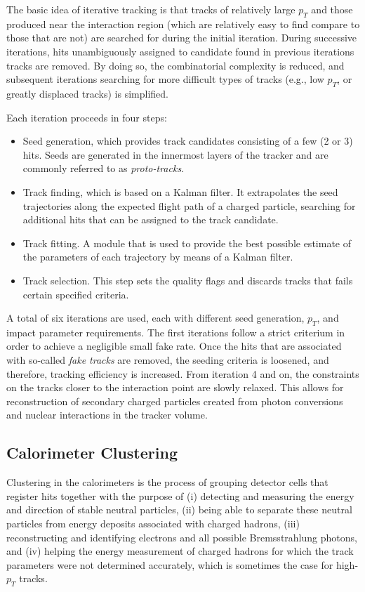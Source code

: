 The basic idea of iterative tracking is that tracks of relatively large $p_{T}$ and those produced near the interaction region (which are relatively easy to find compare to those that are not) are searched for during the initial iteration. During successive iterations, hits unambiguously assigned to candidate found in previous iterations tracks are removed. By doing so, the combinatorial complexity is reduced, and subsequent iterations searching for more difficult types of tracks (e.g., low $p_{T}$, or greatly displaced tracks) is simplified.

Each iteration proceeds in four steps:

\begin{itemize}
	\item Seed generation, which provides track candidates consisting of a few (2 or 3) hits. Seeds are generated in the innermost layers of the tracker and are commonly referred to as \textit{proto-tracks}.
	\item Track finding, which is based on a Kalman filter. It extrapolates the seed trajectories along the expected flight path of a charged particle, searching for additional hits that can be assigned to the track candidate.
	\item Track fitting. A module that is used to provide the best possible estimate of the parameters of each trajectory by means of a Kalman filter.
	\item Track selection. This step sets the quality flags and discards tracks that fails certain specified criteria.
\end{itemize}

A total of six iterations are used, each with different seed generation, $p_{T}$, and impact parameter requirements. The first iterations follow a strict criterium in order to achieve a negligible small fake rate. Once the hits that are associated with so-called \textit{fake tracks} are removed, the seeding criteria is loosened, and therefore, tracking efficiency is increased. From iteration 4 and on, the constraints on the tracks closer to the interaction point are slowly relaxed. This allows for reconstruction of secondary charged particles created from photon conversions and nuclear interactions in the tracker volume.

\subsection{Calorimeter Clustering}
Clustering in the calorimeters is the process of grouping detector cells that register hits together with the purpose of (i) detecting and measuring the energy and direction of stable neutral particles, (ii) being able to separate these neutral particles from energy deposits associated with charged hadrons, (iii) reconstructing and identifying electrons and all possible Bremsstrahlung photons, and (iv) helping the energy measurement of charged hadrons for which the track parameters were not determined accurately, which is sometimes the case for high-$p_{T}$ tracks.

